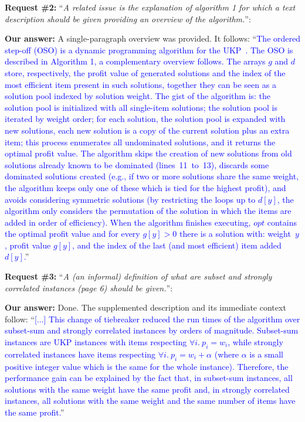 \documentclass{elsarticle}
\begin{document}
\textbf{Request \#2:} ``\textit{A related issue is the explanation of algorithm 1 for which a text description should be given providing an overview of the algorithm.}'':

\textbf{Our answer:} A single-paragraph overview was provided. It follows: ``\textcolor{blue}{The ordered step-off (OSO) is a dynamic programming algorithm for the UKP~\citep{gg-66}.
The OSO is described in Algorithm 1, a complementary overview follows.
The arrays \(g\) and \(d\) store, respectively, the profit value of generated solutions and the index of the most efficient item present in such solutions, together they can be seen as a solution pool indexed by solution weight.
The gist of the algorithm is: the solution pool is initialized with all single-item solutions; the solution pool is iterated by weight order; for each solution, the solution pool is expanded with new solutions, each new solution is a copy of the current solution plus an extra item; this process enumerates all undominated solutions, and it returns the optimal profit value.
The algorithm skips the creation of new solutions from old solutions already known to be dominated (lines~11~to~13), discards some dominated solutions created (e.g., if two or more solutions share the same weight, the algorithm keeps only one of these which is tied for the highest profit), and avoids considering symmetric solutions (by restricting the loops up to \(d[y]\), the algorithm only considers the permutation of the solution in which the items are added in order of efficiency).
When the algorithm finishes executing, \(opt\) contains the optimal profit value and for every \(g[y] > 0\) there is a solution with: weight~\(y\), profit value \(g[y]\), and the index of the last (and most efficient) item added~\(d[y]\).}''
\medskip

\textbf{Request \#3:} ``\textit{A (an informal) definition of what are subset and strongly correlated instances (page 6) should be given.}'':

\textbf{Our answer:} Done. The supplemented description and its immediate context follow: ``\textcolor{blue}{[...] This change of tiebreaker reduced the run times of the algorithm over subset-sum and strongly correlated instances by orders of magnitude. Subset-sum instances are UKP instances with items respecting \(\forall i.~p_i = w_i\), while strongly correlated instances have items respecting \(\forall i.~p_i = w_i + \alpha\) (where \(\alpha\) is a small positive integer value which is the same for the whole instance). Therefore, the performance gain can be explained by the fact that, in subset-sum instances, all solutions with the same weight have the same profit and, in strongly correlated instances, all solutions with the same weight and the same number of items have the same profit.}''
\medskip
\end{document}
